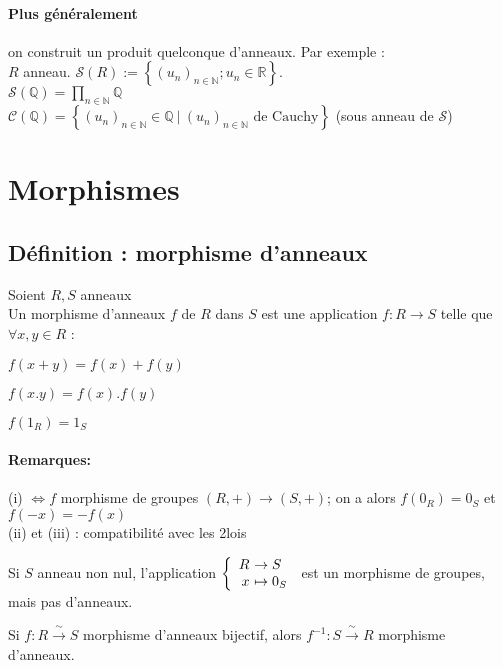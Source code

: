 \documentclass[reqno,a4paper,10pt]{report}
\makeatletter
\newcommand{\set}[1]{\left\lbrace #1 \right\rbrace} %
\newcommand{\IR}{\ensuremath{\mathbb{R}}\xspace} %
\newcommand{\IN}{\ensuremath{\mathbb{N}}\xspace} %
\newcommand{\IQ}{\ensuremath{\mathbb{Q}}\xspace} %
\newcommand{\bij}{\overset{\!\sim}{\to}} %
\newcommand{\such}{\ | \ }
\let\olditemize=\itemize%
\renewenvironment{itemize}{%
    \olditemize%
  }{%
    \@noparlisttrue%
    \endlist%
  }%
\let\oldenumerate=\enumerate%
\renewenvironment{enumerate}{%
    \oldenumerate%
  }{%
    \@noparlisttrue%
    \endlist%
  }%
\makeatother
\begin{document}
\paragraph{Plus généralement}
on construit un produit quelconque d'anneaux. Par exemple : \\
$R$ anneau. $\mathscr{S}(R) := \set{(u_n)_{n\in \IN}; u_n \in \IR}$.\\
$\mathscr{S}(\IQ)=\prod_{n\in \IN} \IQ$\\
$\mathscr{C}(\IQ)=\set{(u_n)_{n\in \IN} \in \mathscr{\IQ} \such (u_n)_{n\in
\IN} \text{ de Cauchy}}$ (sous anneau de $\mathscr{S}$)

\section{Morphismes}
\subsection{Définition : morphisme d'anneaux}
Soient $R,S$ anneaux\\
Un morphisme d'anneaux $f$ de $R$ dans $S$ est une application $f: R \to S$
telle que $\forall x,y \in R$ :
\begin{enumerate}[(i)]
  \item $f(x+y) = f(x)+f(y)$
  \item $f(x.y) = f(x).f(y)$
  \item $f(1_R) = 1_S$
\end{enumerate}
                 
\paragraph{Remarques:}
\begin{itemize}
  \item (i) $\iff f$ morphisme de groupes $(R,+) \to (S,+)$; on a alors
    $f(0_R) = 0_S$ et $f(-x) = -f(x)$\\
    (ii) et (iii) : compatibilité avec les 2\iemes lois
  \item Si $S$ anneau non nul, l'application
    $\left\{
    \begin{array}{r@{\ }l}
      R &\to S\\
      x &\mapsto 0_S
    \end{array}\right.$ 
    est un morphisme de groupes, mais pas d'anneaux.
  \item Si $f: R \bij S$ morphisme d'anneaux bijectif, alors $f^{-1}: S \bij R$
    morphisme d'anneaux.
\end{itemize}     
\end{document}
